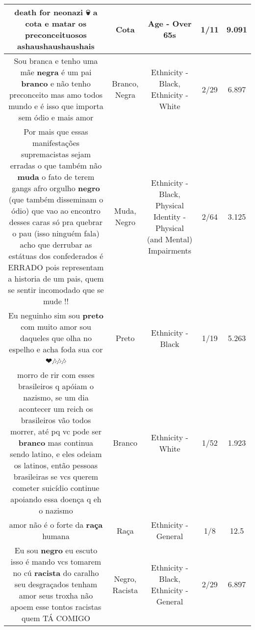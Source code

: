 \documentclass[11pt]{article}
\newlength\mylength
\begin{document}
\begin{center}
\begin{longtable}{|C{.65\mylength}|C{.30\mylength}|C{.12\mylength}|C{.12\mylength}|C{.12\mylength}|}
  \small death for neonazi 💀 a \textbf{cota} e matar os preconceituosos ashaushaushaushais\normalsize   & Cota & Age - Over 65s & 1/11 & 9.091 \\  \hline
  \small Sou branca e tenho uma mãe \textbf{negra} é um pai \textbf{branco} e não tenho preconceito mas amo todos mundo e é isso que importa sem ódio e mais amor\normalsize   & Branco, Negra & Ethnicity - Black, Ethnicity - White & 2/29 & 6.897 \\  \hline
  \small Por mais que essas manifestações supremacistas sejam erradas o que também não \textbf{muda} o fato de terem gangs afro orgulho \textbf{negro} (que também disseminam o ódio)  que vao ao encontro desses caras só pra quebrar o pau (isso ninguém fala)  acho que derrubar as estátuas dos confederados é ERRADO pois representam a historia de um pais, quem se sentir incomodado que se mude !!\normalsize   & Muda, Negro & Ethnicity - Black, Physical Identity - Physical (and Mental) Impairments & 2/64 & 3.125 \\  \hline
  \small Eu neguinho sim sou \textbf{preto} com muito amor sou daqueles que olha no espelho e acha foda sua cor❤🎶🎶🎶\normalsize   & Preto & Ethnicity - Black & 1/19 & 5.263 \\  \hline
  \small morro de rir com esses brasileiros q apóiam o nazismo, se um dia acontecer um reich os brasileiros vão todos morrer, até pq vc pode ser \textbf{branco} mas continua sendo latino, e eles odeiam os latinos, então pessoas brasileiras se vcs querem cometer suicídio continue apoiando essa doença q eh o nazismo\normalsize   & Branco & Ethnicity - White & 1/52 & 1.923 \\  \hline
  \small amor não é o forte da \textbf{raça} humana\normalsize   & Raça & Ethnicity - General & 1/8 & 12.5 \\  \hline
  \small Eu sou \textbf{negro} eu escuto isso é mando vcs tomarem no cú \textbf{racista} do caralho seu desgraçados tenham amor seus troxha não apoem esse tontos racistas quem TÁ COMIGO\normalsize   & Negro, Racista & Ethnicity - Black, Ethnicity - General & 2/29 & 6.897 \\  \hline

\end{longtable}
\end{center}
\end{document}
